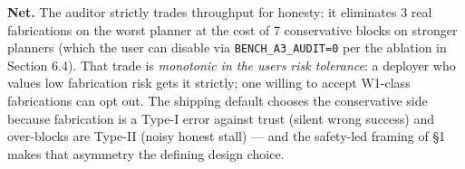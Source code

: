 \textbf{Net.} The auditor strictly trades throughput for honesty: it eliminates 3 real fabrications on the
worst planner at the cost of 7 conservative blocks on stronger planners (which the user can disable
via \texttt{BENCH\_A3\_AUDIT=0} per the ablation in Section 6.4). That trade is \emph{monotonic in the user\textquotesingle s risk
tolerance}: a deployer who values low fabrication risk gets it strictly; one willing to accept
W1-class fabrications can opt out. The shipping default chooses the conservative side because
fabrication is a Type-I error against trust (silent wrong success) and over-blocks are Type-II
(noisy honest stall) --- and the safety-led framing of §1 makes that asymmetry the defining design choice.

